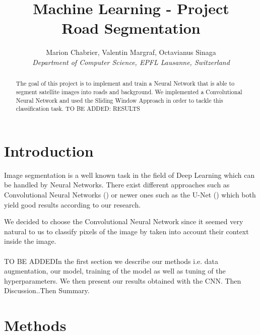 \documentclass[10pt,conference,compsocconf]{IEEEtran}
\begin{document}
\title{Machine Learning - Project \\ Road Segmentation}

\author{
	Marion Chabrier, Valentin Margraf, Octavianus Sinaga\\
	\textit{Department of Computer Science, EPFL Lausanne, Switzerland}
}

\maketitle

\begin{abstract}
	The goal of this project is to implement and train a Neural Network that is able to segment satellite images into roads and background. We implemented a Convolutional Neural Network and used the Sliding Window Approach in order to tackle this classification task. TO BE ADDED: RESULTS 
\end{abstract}

\section{Introduction}
Image segmentation is a well known task in the field of Deep Learning which can be handled by Neural Networks. There exist different approaches such as Convolutional Neural Networks (\cite{pixelwise}) or newer ones such as the U-Net (\cite{unet}) which both yield good results according to our research.

We decided to choose the Convolutional Neural Network since it seemed very natural to us to classify pixels of the image by taken into account their context inside the image. 
\\\\TO BE ADDEDIn the first section we describe our methods i.e. data augmentation, our model, training of the model as well as tuning of the hyperparameters.
We then present our results obtained with the CNN. Then Discussion..Then Summary.


\section{Methods}
\end{document}
